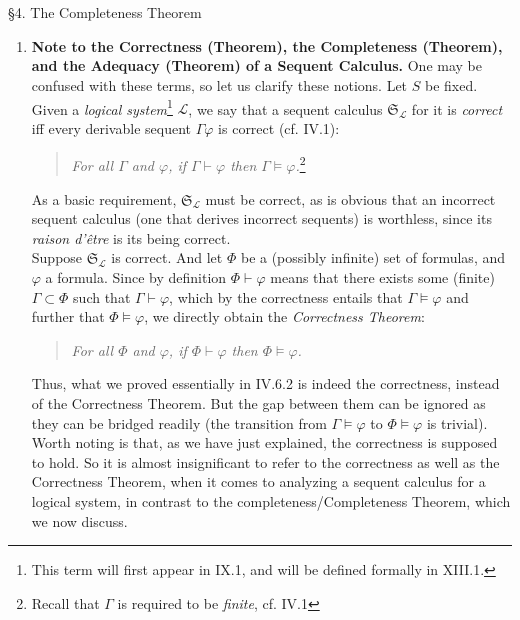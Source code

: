 \ 
\\
\\
\newpage\noindent
{\large \S4. The Completeness Theorem}
\begin{enumerate}[1.]
\item \textbf{Note to the Correctness (Theorem), the Completeness (Theorem), and the Adequacy (Theorem) of a Sequent Calculus.} One may be confused with these terms, so let us clarify these notions. Let $S$ be fixed. Given a \emph{logical system}\footnote{This term will first appear in IX.1, and will be defined formally in XIII.1.} $\mathcal{L}$, we say that a sequent calculus $\mathfrak{S}_\mathcal{L}$ for it is \emph{correct} iff every derivable sequent $\Gamma\varphi$ is correct (cf. IV.1):
\begin{quote}
\emph{For all $\Gamma$ and $\varphi$, if $\Gamma \vdash \varphi$ then $\Gamma \models \varphi$.}\footnote{Recall that $\Gamma$ is required to be \emph{finite}, cf. IV.1}
\end{quote}
As a basic requirement, $\mathfrak{S}_\mathcal{L}$ must be correct, as is obvious that an incorrect sequent calculus (one that derives incorrect sequents) is worthless, since its \emph{raison d'\^{e}tre} is its being correct.\newline
\ 
\\Suppose $\mathfrak{S}_\mathcal{L}$ is correct. And let $\Phi$ be a (possibly infinite) set of formulas, and $\varphi$ a formula. Since by definition $\Phi \vdash \varphi$ means that there exists some (finite) $\Gamma \subset \Phi$ such that $\Gamma \vdash \varphi$, which by the correctness entails that $\Gamma \models \varphi$ and further that $\Phi \models \varphi$, we directly obtain the \emph{Correctness Theorem}:
\begin{quote}
\emph{For all $\Phi$ and $\varphi$, if $\Phi \vdash \varphi$ then $\Phi \models \varphi$.}
\end{quote}
Thus, what we proved essentially in IV.6.2 is indeed the correctness, instead of the Correctness Theorem. But the gap between them can be ignored as they can be bridged readily (the transition from $\Gamma \models \varphi$ to $\Phi \models \varphi$ is trivial).\newline
\ 
\\Worth noting is that, as we have just explained, the correctness is supposed to hold. So it is almost insignificant to refer to the correctness as well as the Correctness Theorem, when it comes to analyzing a sequent calculus for a logical system, in contrast to the completeness/Completeness Theorem, which we now discuss.\newline

\end{enumerate}
